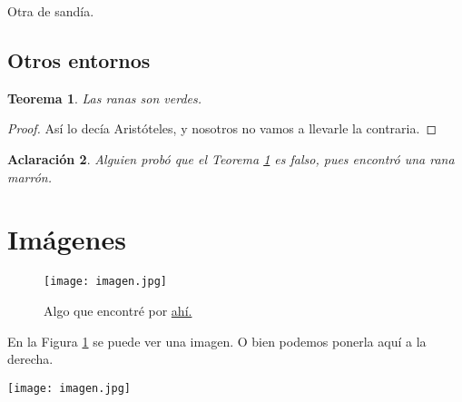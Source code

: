 \documentclass[11pt]{amsart}
\begin{document}
\begin{ejer}
Otra de sandía.
\end{ejer}

\subsection{Otros entornos}

\newtheorem{teorema}{Teorema}[section]
\newtheorem{nota}[teorema]{Aclaración}

\begin{teorema}\label{tonto}
Las ranas son verdes.
\end{teorema}
\begin{proof}
Así lo decía Aristóteles, y nosotros no vamos a llevarle la contraria.
\end{proof}

\begin{nota}
Alguien probó que el Teorema \ref{tonto} es falso, pues encontró una rana marrón.
\end{nota}


\section{Imágenes}

\begin{figure}
\texttt{[image: imagen.jpg]}  %
\caption{Algo que encontré por %
\href{http://www3.interscience.wiley.com/journal/13087/home/ForAuthors.html}{ahí.}%
}
\label{uno} 
\end{figure}

\begin{minipage}{8cm}
En la Figura \ref{uno} se puede ver una imagen. O bien podemos ponerla aquí a la derecha. 
\end{minipage} 
\hfill \begin{minipage}{3cm}
\texttt{[image: imagen.jpg]}
\end{minipage}
\end{document}
